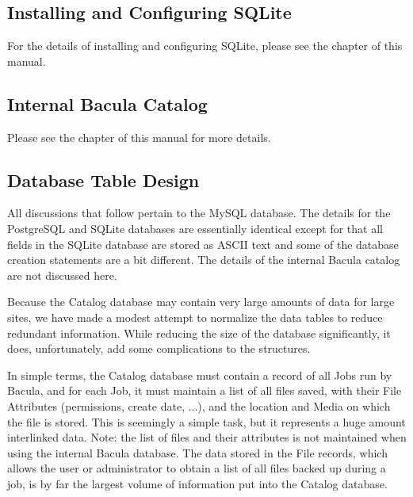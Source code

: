 {{{\subsection{Installing and Configuring SQLite}

For the details of installing and configuring SQLite, please see the
 chapter of
this manual.

\subsection{Internal Bacula Catalog}

Please see the
 chapter of this
manual for more details.

\subsection{Database Table Design}

All discussions that follow pertain to the MySQL database. The details for the
PostgreSQL and SQLite databases are essentially identical except for that all
fields in the SQLite database are stored as ASCII text and some of the
database creation statements are a bit different. The details of the internal
Bacula catalog are not discussed here.

Because the Catalog database may contain very large amounts of data for large
sites, we have made a modest attempt to normalize the data tables to reduce
redundant information. While reducing the size of the database significantly,
it does, unfortunately, add some complications to the structures.

In simple terms, the Catalog database must contain a record of all Jobs run by
Bacula, and for each Job, it must maintain a list of all files saved, with
their File Attributes (permissions, create date, ...), and the location and
Media on which the file is stored. This is seemingly a simple task, but it
represents a huge amount interlinked data. Note: the list of files and their
attributes is not maintained when using the internal Bacula database. The data
stored in the File records, which allows the user or administrator to obtain a
list of all files backed up during a job, is by far the largest volume of
information put into the Catalog database.

}}}
